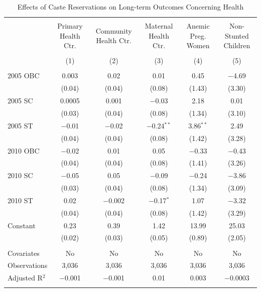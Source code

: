 \begin{table}
\centering
\begin{threeparttable}

  \caption{Effects of Caste Reservations on Long-term Outcomes Concerning Health} 
  \label{raj_caste_shrug_health_05_10} 
\scriptsize 
\begin{tabular}{@{\extracolsep{0pt}}lccccc} 
\\[-1.8ex]\hline 
\hline \\[-1.8ex] 
 & Primary Health Ctr. & Community Health Ctr. & Maternal Health Ctr. & Anemic Preg. Women & Non-Stunted Children \\ 
\\[-1.8ex] & (1) & (2) & (3) & (4) & (5)\\ 
\hline \\[-1.8ex] 
 2005 OBC & 0.003 & 0.02 & 0.01 & 0.45 & $-$4.69 \\ 
  & (0.04) & (0.04) & (0.08) & (1.43) & (3.30) \\ 
  2005 SC & 0.0005 & 0.001 & $-$0.03 & 2.18 & 0.01 \\ 
  & (0.03) & (0.04) & (0.08) & (1.34) & (3.10) \\ 
  2005 ST & $-$0.01 & $-$0.02 & $-$0.24$^{**}$ & 3.86$^{**}$ & 2.49 \\ 
  & (0.04) & (0.04) & (0.08) & (1.42) & (3.28) \\ 
  2010 OBC & $-$0.02 & 0.01 & 0.05 & $-$0.33 & $-$0.43 \\ 
  & (0.04) & (0.04) & (0.08) & (1.41) & (3.26) \\ 
  2010 SC & $-$0.05 & 0.05 & $-$0.09 & $-$0.24 & $-$3.86 \\ 
  & (0.03) & (0.04) & (0.08) & (1.34) & (3.09) \\ 
  2010 ST & 0.02 & $-$0.002 & $-$0.17$^{*}$ & 1.07 & $-$3.32 \\ 
  & (0.04) & (0.04) & (0.08) & (1.42) & (3.29) \\ 
  Constant & 0.23 & 0.39 & 1.42 & 13.99 & 25.03 \\ 
  & (0.02) & (0.03) & (0.05) & (0.89) & (2.05) \\ 
 \hline \\[-1.8ex] 
Covariates & No & No & No & No & No \\ 
Observations & 3,036 & 3,036 & 3,036 & 3,036 & 3,036 \\ 
Adjusted R$^{2}$ & $-$0.001 & $-$0.001 & 0.01 & 0.003 & $-$0.0003 \\ 
\hline 
\hline \\[-1.8ex] 

\end{tabular}
\end{threeparttable}
\end{table}
